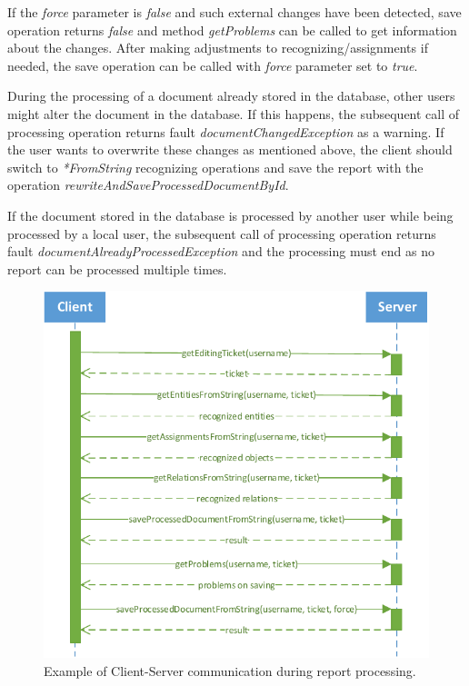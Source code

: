 If the \emph{force} parameter is \emph{false} and such external changes have
been detected, save operation returns \emph{false} and method \emph{getProblems} can be
called to get information about the changes. After making adjustments to
recognizing/assignments if needed, the save operation can be called with
\emph{force} parameter set to \emph{true}.

During the processing of a document already stored in the database, other users
might alter the document in the database. If this happens, the subsequent call of processing
operation returns fault \emph{documentChangedException} as a warning. If the
user wants to overwrite these changes as mentioned above, the client should
switch to \emph{*FromString} recognizing operations and save the report with
the operation \emph{rewriteAndSaveProcessedDocumentById}.

If the document stored in the database is processed by another user while
being processed by a local user, the subsequent call of processing operation
returns fault \emph{documentAlreadyProcessedException} and the processing must
end as no report can be processed multiple times.

\begin{figure}[!htb]
        \centering
        \includegraphics{Images/ClientServerCommunication}
        \caption{Example of Client-Server communication during report processing.}
        \label{fig:ClientServerCommunication}
\end{figure}
